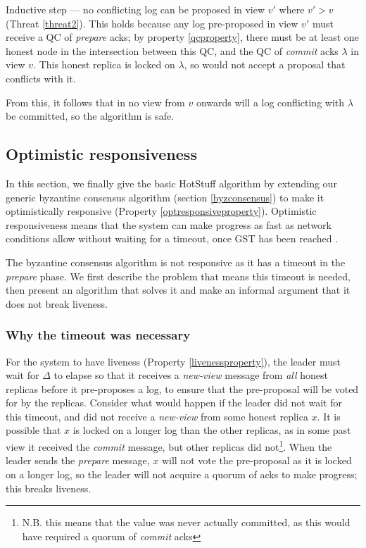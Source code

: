 Inductive step --- no conflicting log can be proposed in view $v'$ where $v' > v$ (Threat \ref{threat2}). This holds because any log pre-proposed in view $v'$ must receive a QC of \textit{prepare} acks; by property \ref{qcproperty}, there must be at least one honest node in the intersection between this QC, and the QC of \textit{commit} acks $\lambda$ in view $v$. This honest replica is locked on $\lambda$, so would not accept a proposal that conflicts with it.

From this, it follows that in no view from $v$ onwards will a log conflicting with $\lambda$ be committed, so the algorithm is safe.

\subsection{Optimistic responsiveness} \label{optresponsive}
In this section, we finally give the basic HotStuff algorithm by extending our generic byzantine consensus algorithm (section \ref{byzconsensus}) to make it optimistically responsive (Property \ref{optresponsiveproperty}). Optimistic responsiveness means that the system can make progress as fast as network conditions allow without waiting for a timeout, once GST has been reached \cite{passThunderellaBlockchainsOptimistic2018}.

The byzantine consensus algorithm is not responsive as it has a timeout in the \textit{prepare} phase. We first describe the problem that means this timeout is needed, then present an algorithm that solves it and make an informal argument that it does not break liveness.

\subsubsection{Why the timeout was necessary}
For the system to have liveness (Property \ref{livenessproperty}), the leader must wait for $\Delta$ to elapse so that it receives a \textit{new-view} message from \textit{all} honest replicas before it pre-proposes a log, to ensure that the pre-proposal will be voted for by the replicas. Consider what would happen if the leader did not wait for this timeout, and did not receive a \textit{new-view} from some honest replica $x$. It is possible that $x$ is locked on a longer log than the other replicas, as in some past view it received the \textit{commit} message, but other replicas did not\footnote{N.B. this means that the value was never actually committed, as this would have required a quorum of \textit{commit} acks}. When the leader sends the \textit{prepare} message, $x$ will not vote the pre-proposal as it is locked on a longer log, so the leader will not acquire a quorum of acks to make progress; this breaks liveness.

